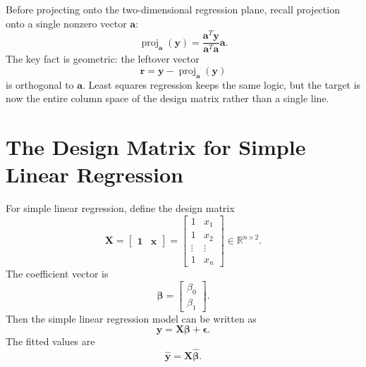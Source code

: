 {Before projecting onto the two-dimensional regression plane, recall projection onto a single nonzero vector \(\mathbf{a}\):
\begin{equation}
  \operatorname{proj}_{\mathbf{a}}(\mathbf{y})
  =\frac{\mathbf{a}^T\mathbf{y}}{\mathbf{a}^T\mathbf{a}}\mathbf{a}.
  \label{eq:ch7-one-vector-projection}
\end{equation}
The key fact is geometric: the leftover vector
\begin{equation}
  \mathbf{r}=\mathbf{y}-\operatorname{proj}_{\mathbf{a}}(\mathbf{y})
\end{equation}
is orthogonal to \(\mathbf{a}\).  Least squares regression keeps the same logic, but the target is now the entire column space of the design matrix rather than a single line.
}

\section{The Design Matrix for Simple Linear Regression}

For simple linear regression, define the design matrix
\begin{equation}
  \mathbf{X}=\begin{bmatrix}\mathbf{1}&\mathbf{x}\end{bmatrix}
  =
  \begin{bmatrix}
    1 & x_1 \\
    1 & x_2 \\
    \vdots & \vdots \\
    1 & x_n
  \end{bmatrix}
  \in \mathbb{R}^{n\times 2}.
  \label{eq:ch7-slr-design-matrix}
\end{equation}
The coefficient vector is
\begin{equation}
  \boldsymbol{\beta}=\begin{bmatrix}\beta_0\\\beta_1\end{bmatrix}.
\end{equation}
Then the simple linear regression model can be written as
\begin{equation}
  \mathbf{y}=\mathbf{X}\boldsymbol{\beta}+\boldsymbol{\epsilon}.
  \label{eq:ch7-slr-matrix-model}
\end{equation}
The fitted values are
\begin{equation}
  \widehat{\mathbf{y}}=\mathbf{X}\widehat{\boldsymbol{\beta}}.
  \label{eq:ch7-fitted-values}
\end{equation}

